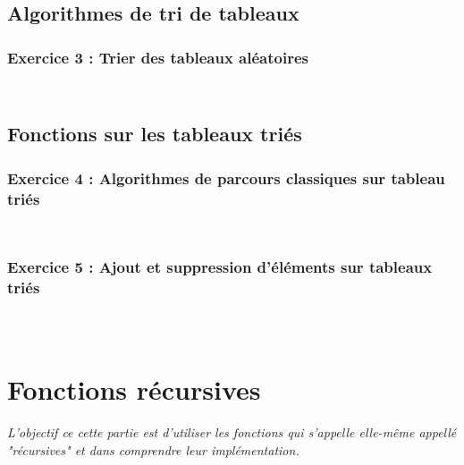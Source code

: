 \inputminted[linenos,firstline=29, lastline=35]{cpp}{../sources/cpp/TP1-2/modifTableauxNonTries.c}

\subsection{Algorithmes de tri de tableaux}
\subsubsection{Exercice 3 : Trier des tableaux aléatoires}

\inputminted[linenos,firstline=7, lastline=18]{cpp}{../sources/cpp/TP1-2/algosTri.c}

\inputminted[linenos,firstline=20, lastline=31]{cpp}{../sources/cpp/TP1-2/algosTri.c}

\subsection{Fonctions sur les tableaux triés}

\subsubsection{Exercice 4 : Algorithmes de parcours classiques sur tableau triés}

\inputminted[linenos,firstline=7, lastline=22]{cpp}{../sources/cpp/TP1-2/manipTableauxTries.c}

\inputminted[linenos,firstline=24, lastline=48]{cpp}{../sources/cpp/TP1-2/manipTableauxTries.c}

\subsubsection{Exercice 5 : Ajout et suppression d’éléments sur tableaux triés}

\inputminted[linenos,firstline=7, lastline=25]{cpp}{../sources/cpp/TP1-2/modifTableauxTries.c}

\inputminted[linenos,firstline=27, lastline=46]{cpp}{../sources/cpp/TP1-2/modifTableauxTries.c}

\inputminted[linenos,firstline=48, lastline=81]{cpp}{../sources/cpp/TP1-2/modifTableauxTries.c}

\section{Fonctions récursives}
\textit{L’objectif ce cette partie est d’utiliser les fonctions qui s’appelle elle-même appellé "récursives" et dans comprendre leur implémentation.}

